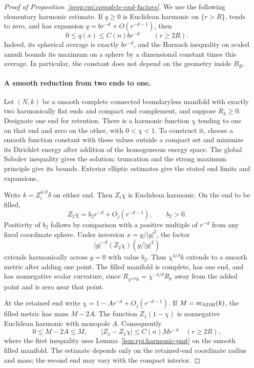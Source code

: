 \begin{proof}[Proof of Proposition~\ref{prop:rpi:complete-end-factors}]
We use the following elementary harmonic estimate.  If $q\ge0$ is
Euclidean harmonic on $\{r>R\}$, tends to zero, and has expansion
$q=b r^{-d}+O(r^{-d-1})$, then
\begin{equation}\label{eq:rpi:positive-harmonic-monopole}
 0\le q(x)\le C(n)b r^{-d}\qquad(r\ge2R).
\end{equation}
Indeed, its spherical average is exactly $b r^{-d}$, and the Harnack
inequality on scaled annuli bounds its maximum on a sphere by a
dimensional constant times this average.  In particular, the constant
does not depend on the geometry inside $B_R$.

\paragraph{A smooth reduction from two ends to one.}
Let $(N,k)$ be a smooth complete connected boundaryless manifold with
exactly two harmonically flat ends and compact end complement, and
suppose $R_k\ge0$. Designate one end for retention. There is a
harmonic function $\chi$ tending to one on that end and zero on the
other, with $0<\chi<1$.  To construct it, choose a smooth function
constant with these values outside a compact set and minimize its
Dirichlet energy after addition of the homogeneous energy space.
The global Sobolev inequality gives the solution; truncation and the
strong maximum principle give its bounds.  Exterior elliptic estimates
give the stated end limits and expansions.

Write $k=Z_i^{4/d}\delta$ on either end.  Then $Z_i\chi$ is Euclidean
harmonic.  On the end to be filled,
\[
 Z_2\chi=b_2r^{-d}+O_j(r^{-d-1}),\qquad b_2>0.
\]
Positivity of $b_2$ follows by comparison with a positive multiple of
$r^{-d}$ from any fixed coordinate sphere.  Under inversion
$x=y/|y|^2$, the factor
\[
 |y|^{-d}(Z_2\chi)(y/|y|^2)
\]
extends harmonically across $y=0$ with value $b_2$.  Thus
$\chi^{4/d}k$ extends to a smooth metric after adding one point.
The filled manifold is complete, has one end, and has nonnegative
scalar curvature, since
$R_{\chi^{4/d}k}=\chi^{-4/d}R_k$ away from the added point and is zero
near that point.

At the retained end write
$\chi=1-A r^{-d}+O_j(r^{-d-1})$.  If $M=m_{\rm ADM}(k)$, the filled
metric has mass $M-2A$.  The function $Z_1(1-\chi)$ is nonnegative
Euclidean harmonic with monopole $A$.  Consequently
\begin{equation}\label{eq:rpi:one-end-reduction}
 0\le M-2A\le M,\qquad
 |Z_1-Z_1\chi|\le C(n)M r^{-d}\quad(r\ge2R),
\end{equation}
where the first inequality uses
Lemma~\ref{lem:rpi:harmonic-pmt} on the smooth filled manifold.
The estimate depends only on the retained-end coordinate radius and
mass; the second end may vary with the compact interior.


\end{proof}
